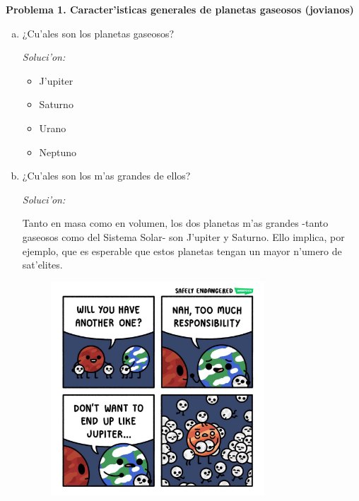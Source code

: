 \documentclass{article}
\newenvironment{myfont}{\fontfamily{pnc}\selectfont}{\par}
\begin{document}
\textbf{Problema 1. Caracter'isticas generales de planetas gaseosos (jovianos)}

\vspace{3mm}

\begin{enumerate}[a)] 

\begin{myfont}\item ¿Cu'ales son los planetas gaseosos? \end{myfont}

\emph{Soluci'on:}

\begin{multicols}{2}

\begin{itemize}
\item J'upiter
\item Saturno
\item Urano
\item Neptuno
\end{itemize}
\end{multicols}



\begin{myfont} \item ¿Cu'ales son los m'as grandes de ellos? \end{myfont}

\emph{Soluci'on:}


Tanto en masa como en volumen, los dos planetas m'as grandes -tanto gaseosos como del Sistema Solar- son J'upiter y Saturno. Ello implica, por ejemplo, que es esperable que estos planetas tengan un mayor n'umero de sat'elites.

\newlength{\strutheight}
\settoheight{\strutheight}{\strut}
    
    \begin{adjustbox}{valign=T,raise=\strutheight,minipage={\linewidth}}
    \vspace{-1cm}
      \begin{figure}
        \includegraphics[width=8.0cm]{jupiter_pls.jpg}
      \end{figure}
    \strut{}
    \end{adjustbox}


\end{enumerate}
\end{document}
